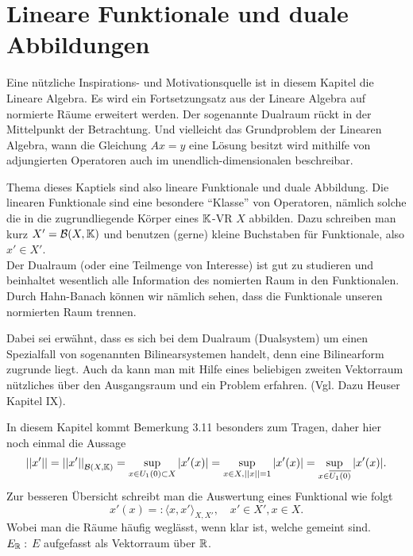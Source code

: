 \chapter{Lineare Funktionale und duale Abbildungen}

	\begin{motivation}
		Eine nützliche Inspirations- und Motivationsquelle ist in diesem Kapitel 
		die Lineare Algebra. Es wird ein Fortsetzungsatz aus der Lineare Algebra 
		auf normierte Räume erweitert werden. Der sogenannte Dualraum rückt in der 
		Mittelpunkt der Betrachtung. Und vielleicht das Grundproblem der Linearen Algebra,
		wann die Gleichung $Ax = y$ eine Lösung besitzt wird mithilfe von 
		adjungierten Operatoren auch im unendlich-dimensionalen beschreibar.
		\par
		Thema dieses Kaptiels sind also lineare Funktionale und duale Abbildung. 
		Die linearen Funktionale sind eine besondere \enquote{Klasse} von Operatoren,
		nämlich solche die in die zugrundliegende Körper eines $\mathbb{K}$-VR $X$ abbilden.
		Dazu schreiben man kurz $X' = \mathcal{B}(X,\mathbb{K})$ und benutzen (gerne) kleine Buchstaben 
		für Funktionale, also $x' \in X'$. \\
		Der Dualraum (oder eine Teilmenge von Interesse) ist gut zu 
		studieren und beinhaltet wesentlich alle Information des nomierten Raum 
		in den Funktionalen. Durch Hahn-Banach können wir nämlich sehen, dass 
		die Funktionale unseren normierten Raum trennen.
		\par	
		{\footnotesize Dabei sei erwähnt, dass es sich bei dem Dualraum 
		(Dualsystem) um einen Spezialfall von sogenannten Bilinearsystemen handelt, denn
		eine Bilinearform zugrunde liegt. Auch da kann man mit Hilfe eines beliebigen 
		zweiten Vektorraum nützliches über den Ausgangsraum und ein Problem erfahren. 
		(Vgl. Dazu Heuser Kapitel IX).}
		\par
	\end{motivation}
	\begin{bem*} 
		In diesem Kapitel kommt Bemerkung 3.11 besonders zum Tragen,
		daher hier noch einmal die Aussage
		\spcm $$ \norm{x'} = \norm{x'}_{\B(X,\K)} = \sup_{x\in \EK \subset X}|x'(x)| =
		\sup_{x\in X, \norm{x} = 1} |x'(x)| = \sup_{x\in \overline{\EK}}|x'(x)|. \spcm$$
		Zur besseren Übersicht schreibt man die Auswertung eines Funktional wie folgt 
			$$x'(x) =: \langle x,x' \rangle _{X,X'}, \quad x' \in X', x\in X.$$ 
		Wobei man die Räume häufig weglässt, wenn klar ist, welche gemeint sind.\\
		$E_{\mathbb{R}}:$ $E$ aufgefasst als Vektorraum über $\mathbb{R}$. 
	\end{bem*}

